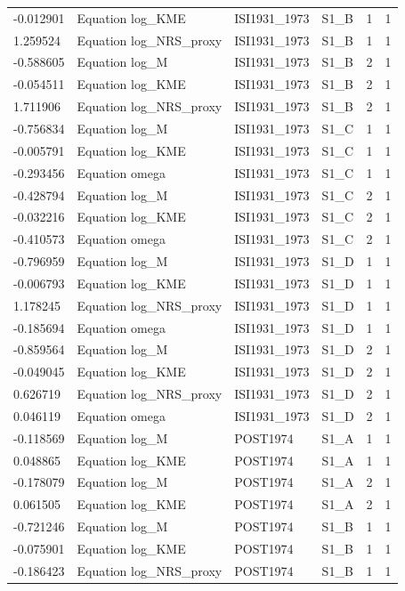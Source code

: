 \begin{tabular}{llllll}
-0.012901 & Equation log\_KME & ISI1931\_1973 & S1\_B & 1 & 1 \\
1.259524 & Equation log\_NRS\_proxy & ISI1931\_1973 & S1\_B & 1 & 1 \\
-0.588605 & Equation log\_M & ISI1931\_1973 & S1\_B & 2 & 1 \\
-0.054511 & Equation log\_KME & ISI1931\_1973 & S1\_B & 2 & 1 \\
1.711906 & Equation log\_NRS\_proxy & ISI1931\_1973 & S1\_B & 2 & 1 \\
-0.756834 & Equation log\_M & ISI1931\_1973 & S1\_C & 1 & 1 \\
-0.005791 & Equation log\_KME & ISI1931\_1973 & S1\_C & 1 & 1 \\
-0.293456 & Equation omega & ISI1931\_1973 & S1\_C & 1 & 1 \\
-0.428794 & Equation log\_M & ISI1931\_1973 & S1\_C & 2 & 1 \\
-0.032216 & Equation log\_KME & ISI1931\_1973 & S1\_C & 2 & 1 \\
-0.410573 & Equation omega & ISI1931\_1973 & S1\_C & 2 & 1 \\
-0.796959 & Equation log\_M & ISI1931\_1973 & S1\_D & 1 & 1 \\
-0.006793 & Equation log\_KME & ISI1931\_1973 & S1\_D & 1 & 1 \\
1.178245 & Equation log\_NRS\_proxy & ISI1931\_1973 & S1\_D & 1 & 1 \\
-0.185694 & Equation omega & ISI1931\_1973 & S1\_D & 1 & 1 \\
-0.859564 & Equation log\_M & ISI1931\_1973 & S1\_D & 2 & 1 \\
-0.049045 & Equation log\_KME & ISI1931\_1973 & S1\_D & 2 & 1 \\
0.626719 & Equation log\_NRS\_proxy & ISI1931\_1973 & S1\_D & 2 & 1 \\
0.046119 & Equation omega & ISI1931\_1973 & S1\_D & 2 & 1 \\
-0.118569 & Equation log\_M & POST1974 & S1\_A & 1 & 1 \\
0.048865 & Equation log\_KME & POST1974 & S1\_A & 1 & 1 \\
-0.178079 & Equation log\_M & POST1974 & S1\_A & 2 & 1 \\
0.061505 & Equation log\_KME & POST1974 & S1\_A & 2 & 1 \\
-0.721246 & Equation log\_M & POST1974 & S1\_B & 1 & 1 \\
-0.075901 & Equation log\_KME & POST1974 & S1\_B & 1 & 1 \\
-0.186423 & Equation log\_NRS\_proxy & POST1974 & S1\_B & 1 & 1 \\

\end{tabular}
